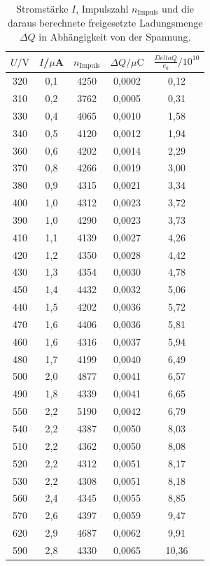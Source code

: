 \begin{table}
  \caption{Stromstärke $I$, Impulszahl $n_\mathrm{Impuls}$ und die daraus berechnete freigesetzte Ladungsmenge $\Delta Q$ in Abhängigkeit von der Spannung.}
  \centering
  \label{tab:frei-ladung}
  \begin{tabular}{c c c c c}
    \toprule
   $U/\si{\volt}$ & $I$/$\mu$\si{\ampere} & $n_\mathrm{Impuls}$ & $\Delta Q /\mu \si{\coulomb}$ & $\frac{Delta Q}{e_0}/10^{10}$\\
    \midrule
320	& 0,1	& 4250 & 0,0002 & 0,12 \\
310	& 0,2	& 3762 & 0,0005 & 0,31\\
330	& 0,4	& 4065 & 0,0010 & 1,58 \\
340	& 0,5	& 4120 & 0,0012 & 1,94 \\
360	& 0,6	& 4202 & 0,0014 & 2,29 \\
370	& 0,8	& 4266 & 0,0019 & 3,00 \\
380	& 0,9	& 4315 & 0,0021 & 3,34 \\
400	& 1,0	& 4312 & 0,0023 & 3,72 \\
390	& 1,0	& 4290 & 0,0023 & 3,73 \\
410	& 1,1	& 4139 & 0,0027 & 4,26 \\
420	& 1,2	& 4350 & 0,0028 & 4,42 \\
430	& 1,3	& 4354 & 0,0030 & 4,78 \\
450	& 1,4	& 4432 & 0,0032 & 5,06 \\
440	& 1,5	& 4202 & 0,0036 & 5,72 \\
470	& 1,6	& 4406 & 0,0036 & 5,81 \\
460	& 1,6	& 4316 & 0,0037 & 5,94 \\
480	& 1,7	& 4199 & 0,0040 & 6,49 \\
500	& 2,0	& 4877 & 0,0041 & 6,57 \\
490	& 1,8	& 4339 & 0,0041 & 6,65 \\
550	& 2,2	& 5190 & 0,0042 & 6,79 \\
540	& 2,2	& 4387 & 0,0050 & 8,03 \\
510	& 2,2	& 4362 & 0,0050 & 8,08 \\
520	& 2,2	& 4312 & 0,0051 & 8,17 \\
530	& 2,2	& 4308 & 0,0051 & 8,18 \\
560	& 2,4	& 4345 & 0,0055 & 8,85 \\
570	& 2,6	& 4397 & 0,0059 & 9,47 \\
620	& 2,9	& 4687 & 0,0062 & 9,91 \\
590	& 2,8	& 4330 & 0,0065 & 10,36 \\

\end{tabular}
\end{table}
